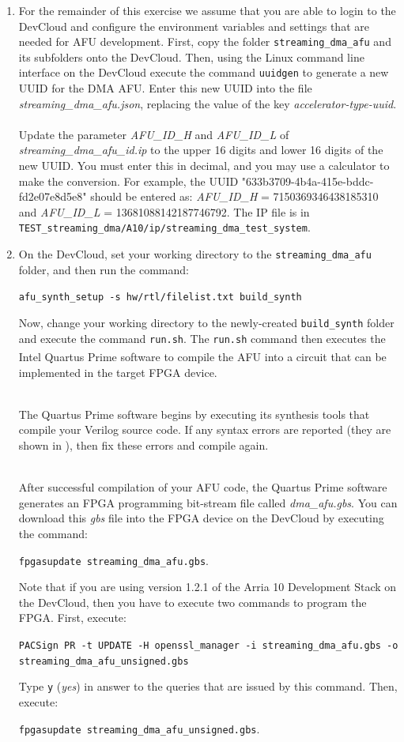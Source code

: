 \documentclass[epsfig,10pt,fullpage]{article}
\begin{document}
\begin{enumerate}
\item
For the remainder of this exercise we assume that you are able to login to the DevCloud and configure the environment variables and settings that are needed for AFU development.  First, copy the folder \texttt{streaming\_dma\_afu} and its subfolders onto the DevCloud.  Then, 
using the Linux command line interface on the DevCloud execute the command 
\texttt{uuidgen} to generate a new UUID for the DMA AFU.
Enter this new UUID into the file \emph{streaming\_dma\_afu.json}, replacing the value of the key \emph{accelerator-type-uuid}.\\
\\
Update the parameter \emph{AFU\_ID\_H}  and \emph{AFU\_ID\_L} of \emph{streaming\_dma\_afu\_id.ip} to the upper 16 digits and lower 16 digits of the new UUID.  You must enter this in decimal, and you may use a calculator to make the conversion. For example, the UUID "633b3709-4b4a-415e-bddc-fd2e07e8d5e8" should be entered as: \emph{AFU\_ID\_H} = 7150369346438185310 and \emph{AFU\_ID\_L} = 13681088142187746792. The IP file is in \texttt{TEST\_streaming\_dma/A10/ip/streaming\_dma\_test\_system}.

\item
On the DevCloud, set your working directory to the \texttt{streaming\_dma\_afu} folder, and then 
run the command: 

\noindent
\texttt{afu\_synth\_setup -s hw/rtl/filelist.txt build\_synth}

Now, change your working directory to the newly-created \texttt{build\_synth} folder and 
execute the command \texttt{run.sh}. 
The \texttt{run.sh} command then executes the Intel 
Quartus\textsuperscript{\textregistered} Prime software to compile the AFU into a circuit
that can be implemented in the target FPGA device.

~\\
\noindent
The Quartus Prime software begins by executing its synthesis tools that
compile your Verilog source code. If any syntax errors are reported (they are shown in 
), then fix these errors and compile again. 

~\\
\noindent
After successful compilation of your AFU code, the Quartus Prime software generates an FPGA 
programming bit-stream file called {\it dma\_afu.gbs}. You can download this {\it gbs} file into the FPGA device on the DevCloud by executing the command:

\noindent
\texttt{fpgasupdate streaming\_dma\_afu.gbs}.

Note that if you are using version 1.2.1 of the Arria 10 Development Stack on the
DevCloud, then you have to execute two commands to program the FPGA. First, execute:

\noindent
\texttt{PACSign PR -t UPDATE -H openssl\_manager -i streaming\_dma\_afu.gbs -o \\ streaming\_dma\_afu\_unsigned.gbs}

\noindent Type \texttt{y} ({\it yes}) in answer to the queries that are issued by this command. 
Then, execute:

\noindent
\texttt{fpgasupdate streaming\_dma\_afu\_unsigned.gbs}.
\end{enumerate}
\end{document}
